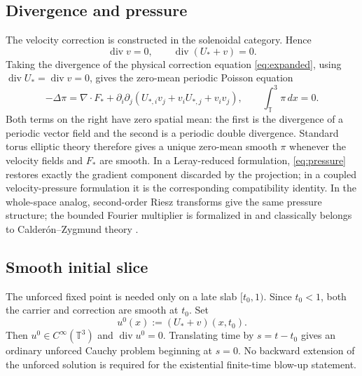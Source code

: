 \documentclass[11pt]{article}
\numberwithin{equation}{section}
\newcommand{\T}{\mathbb T^3}
\newcommand{\diver}{\operatorname{div}}
\begin{document}
\subsection{Divergence and pressure}
The velocity correction is constructed in the solenoidal category.  Hence
\begin{equation}
\diver v=0,
\qquad
\diver(U_*+v)=0.
\label{eq:divcorr}
\end{equation}
Taking the divergence of the physical correction equation \eqref{eq:expanded}, using \(\diver U_*=\diver v=0\), gives the zero-mean periodic Poisson equation
\begin{equation}
\boxed{
-\Delta\pi
=\nabla\!\cdot F_*
+\partial_i\partial_j
\left(U_{*,i}v_j+v_iU_{*,j}+v_iv_j\right),}
\qquad
\int_\T\pi\,dx=0.
\label{eq:pressure}
\end{equation}
Both terms on the right have zero spatial mean: the first is the divergence of a periodic vector field and the second is a periodic double divergence.  Standard torus elliptic theory therefore gives a unique zero-mean smooth \(\pi\) whenever the velocity fields and \(F_*\) are smooth.  In a Leray-reduced formulation, \eqref{eq:pressure} restores exactly the gradient component discarded by the projection; in a coupled velocity-pressure formulation it is the corresponding compatibility identity.  In the whole-space analog, second-order Riesz transforms give the same pressure structure; the bounded Fourier multiplier is formalized in  and classically belongs to Calder\'on--Zygmund theory \cite{Stein1970,OpenAIRepo2026}.

\subsection{Smooth initial slice}
The unforced fixed point is needed only on a late slab \([t_0,1)\).  Since \(t_0<1\), both the carrier and correction are smooth at \(t_0\).  Set
\begin{equation}
u^0(x):=(U_*+v)(x,t_0).
\label{eq:datum}
\end{equation}
Then \(u^0\in C^\infty(\T)\) and \(\diver u^0=0\).  Translating time by \(s=t-t_0\) gives an ordinary unforced Cauchy problem beginning at \(s=0\).  No backward extension of the unforced solution is required for the existential finite-time blow-up statement.
\end{document}
